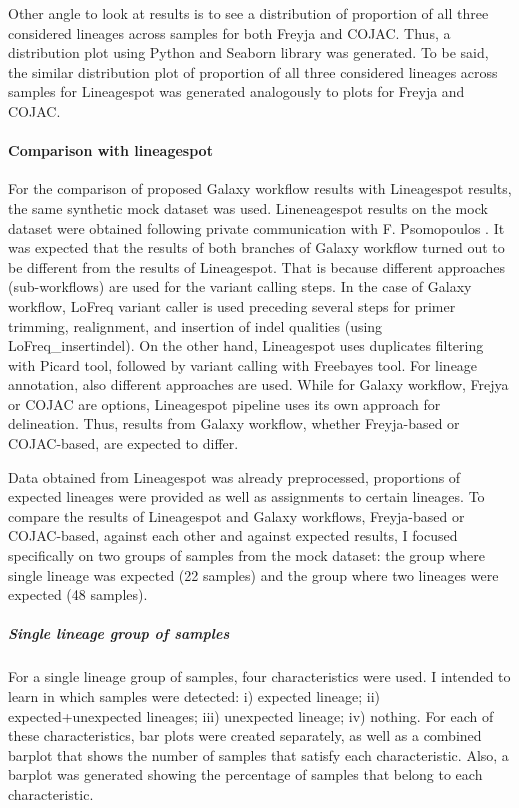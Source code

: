                 Other angle to look at results is to see a distribution of proportion of all three considered lineages across samples for both Freyja and COJAC. Thus, a distribution plot using Python and Seaborn library was generated. To be said, the similar distribution plot of proportion of all three considered lineages across samples for Lineagespot was generated analogously to plots for Freyja and COJAC.

                
            \paragraph{Comparison with lineagespot}
            For the comparison of proposed Galaxy workflow results with Lineagespot results, the same synthetic mock dataset was used. Lineneagespot results on the mock dataset were obtained following private communication with F. Psomopoulos \cite{pechlivanis2022}. It was expected that the results of both branches of Galaxy workflow turned out to be different from the results of Lineagespot. That is because different approaches (sub-workflows) are used for the variant calling steps. In the case of Galaxy workflow, LoFreq variant caller is used preceding several steps for primer trimming, realignment, and insertion of indel qualities (using LoFreq\_insertindel). On the other hand, Lineagespot uses duplicates filtering with Picard tool, followed by variant calling with Freebayes tool. For lineage annotation, also different approaches are used. While for Galaxy workflow, Frejya or COJAC are options, Lineagespot pipeline uses its own approach for delineation. Thus, results from Galaxy workflow, whether Freyja-based or COJAC-based, are expected to differ.

            Data obtained from Lineagespot was already preprocessed, proportions of expected lineages were provided as well as assignments to certain lineages. To compare the results of Lineagespot and Galaxy workflows, Freyja-based or COJAC-based, against each other and against expected results, I focused specifically on two groups of samples from the mock dataset: the group where single lineage was expected (22 samples) and the group where two lineages were expected (48 samples). 

            
                \subparagraph{Single lineage group of samples} 
                For a single lineage group of samples, four characteristics were used. I intended to learn in which samples were detected: i) expected lineage; ii) expected+unexpected lineages; iii) unexpected lineage; iv) nothing. For each of these characteristics, bar plots were created separately, as well as a combined barplot that shows the number of samples that satisfy each characteristic. Also, a barplot was generated showing the percentage of samples that belong to each characteristic.

